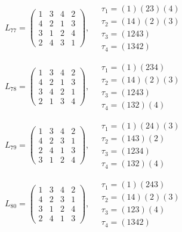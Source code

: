 $L_{77} = \begin{pmatrix} 1 & 3 & 4 & 2 \\ 4 & 2 & 1 & 3 \\ 3 & 1 & 2 & 4 \\ 2 & 4 & 3 & 1 \end{pmatrix}, \quad \begin{matrix} \tau_{1} = (1)(2 3)(4) \\ \tau_{2} = (1 4)(2)(3) \\ \tau_{3} = (1 2 4 3) \\ \tau_{4} = (1 3 4 2) \end{matrix}$

$L_{78} = \begin{pmatrix} 1 & 3 & 4 & 2 \\ 4 & 2 & 1 & 3 \\ 3 & 4 & 2 & 1 \\ 2 & 1 & 3 & 4 \end{pmatrix}, \quad \begin{matrix} \tau_{1} = (1)(2 3 4) \\ \tau_{2} = (1 4)(2)(3) \\ \tau_{3} = (1 2 4 3) \\ \tau_{4} = (1 3 2)(4) \end{matrix}$

$L_{79} = \begin{pmatrix} 1 & 3 & 4 & 2 \\ 4 & 2 & 3 & 1 \\ 2 & 4 & 1 & 3 \\ 3 & 1 & 2 & 4 \end{pmatrix}, \quad \begin{matrix} \tau_{1} = (1)(2 4)(3) \\ \tau_{2} = (1 4 3)(2) \\ \tau_{3} = (1 2 3 4) \\ \tau_{4} = (1 3 2)(4) \end{matrix}$

$L_{80} = \begin{pmatrix} 1 & 3 & 4 & 2 \\ 4 & 2 & 3 & 1 \\ 3 & 1 & 2 & 4 \\ 2 & 4 & 1 & 3 \end{pmatrix}, \quad \begin{matrix} \tau_{1} = (1)(2 4 3) \\ \tau_{2} = (1 4)(2)(3) \\ \tau_{3} = (1 2 3)(4) \\ \tau_{4} = (1 3 4 2) \end{matrix}$

